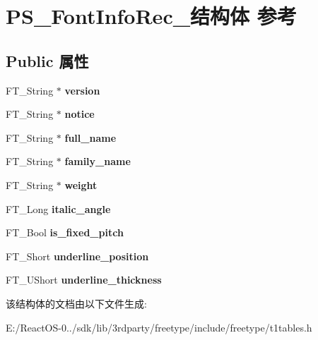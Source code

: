 \hypertarget{struct_p_s___font_info_rec__}{}\section{P\+S\+\_\+\+Font\+Info\+Rec\+\_\+结构体 参考}
\label{struct_p_s___font_info_rec__}
\subsection*{Public 属性}
\begin{DoxyCompactItemize}
\item 
\mbox{\label{struct_p_s___font_info_rec___adb595076e50f8e7ece9446f612433cfc}} 
F\+T\+\_\+\+String $\ast$ {\bfseries version}
\item 
\mbox{\label{struct_p_s___font_info_rec___a63858ebce653f21d9aa2ddc61ee32b80}} 
F\+T\+\_\+\+String $\ast$ {\bfseries notice}
\item 
\mbox{\label{struct_p_s___font_info_rec___a039dbf76ccc1b63b03e77215cb4b430b}} 
F\+T\+\_\+\+String $\ast$ {\bfseries full\+\_\+name}
\item 
\mbox{\label{struct_p_s___font_info_rec___ac54d883f153a495f9a20dc043ed434cf}} 
F\+T\+\_\+\+String $\ast$ {\bfseries family\+\_\+name}
\item 
\mbox{\label{struct_p_s___font_info_rec___a057243ec7cf62f573fa675ccb728f4b1}} 
F\+T\+\_\+\+String $\ast$ {\bfseries weight}
\item 
\mbox{\label{struct_p_s___font_info_rec___ab558a75a56fadd54dfc71dcbeec1375a}} 
F\+T\+\_\+\+Long {\bfseries italic\+\_\+angle}
\item 
\mbox{\label{struct_p_s___font_info_rec___a68e2d0913fe910ea86d558a4a426412a}} 
F\+T\+\_\+\+Bool {\bfseries is\+\_\+fixed\+\_\+pitch}
\item 
\mbox{\label{struct_p_s___font_info_rec___a772af52d17288d7846e8893e74d55212}} 
F\+T\+\_\+\+Short {\bfseries underline\+\_\+position}
\item 
\mbox{\label{struct_p_s___font_info_rec___a423904e811db5195485557bf0dccf126}} 
F\+T\+\_\+\+U\+Short {\bfseries underline\+\_\+thickness}
\end{DoxyCompactItemize}


该结构体的文档由以下文件生成\+:\begin{DoxyCompactItemize}
\item 
E\+:/\+React\+O\+S-\/0../sdk/lib/3rdparty/freetype/include/freetype/t1tables.\+h\end{DoxyCompactItemize}
